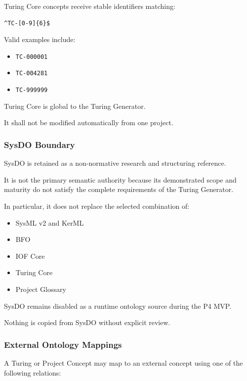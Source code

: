 Turing Core concepts receive stable identifiers matching:

\begin{verbatim}
^TC-[0-9]{6}$
\end{verbatim}

Valid examples include:

\begin{itemize}
\tightlist
\item
  \texttt{TC-000001}
\item
  \texttt{TC-004281}
\item
  \texttt{TC-999999}
\end{itemize}

Turing Core is global to the Turing Generator.

It shall not be modified automatically from one project.

\hypertarget{sysdo-boundary}{%
\subsubsection{SysDO Boundary}\label{sysdo-boundary}}

SysDO is retained as a non-normative research and structuring reference.

It is not the primary semantic authority because its demonstrated scope and maturity do not satisfy the complete requirements of the Turing Generator.

In particular, it does not replace the selected combination of:

\begin{itemize}
\tightlist
\item
  SysML v2 and KerML
\item
  BFO
\item
  IOF Core
\item
  Turing Core
\item
  Project Glossary
\end{itemize}

SysDO remains disabled as a runtime ontology source during the P4 MVP.

Nothing is copied from SysDO without explicit review.

\hypertarget{external-ontology-mappings}{%
\subsubsection{External Ontology Mappings}\label{external-ontology-mappings}}

A Turing or Project Concept may map to an external concept using one of the following relations:

